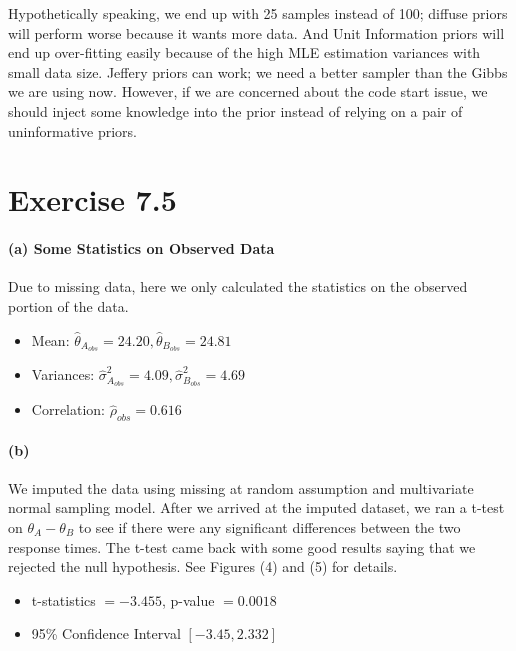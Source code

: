 \documentclass[11pt, letterpaper]{article}
\begin{document}
Hypothetically speaking, we end up with 25 samples instead of 100; diffuse priors will perform worse because it wants more data. And Unit Information priors will end up over-fitting easily because of the high MLE estimation variances with small data size. Jeffery priors can work; we need a better sampler than the Gibbs we are using now. However, if we are concerned about the code start issue, we should inject some knowledge into the prior instead of relying on a pair of uninformative priors.


\newpage
\section{Exercise 7.5}
\paragraph{(a) Some Statistics on Observed Data}
Due to missing data, here we only calculated the statistics on the observed portion of the data.
\begin{itemize}
    \item Mean: $\hat{\theta}_{A_{obs}} = 24.20, \hat{\theta}_{B_{obs}} = 24.81$
    \item Variances: $\hat{\sigma}^2_{A_{obs}} = 4.09, \hat{\sigma}^2_{B_{obs}} = 4.69$
    \item Correlation: $\hat{\rho}_{obs} = 0.616$
\end{itemize}

\paragraph{(b)}
We imputed the data using missing at random assumption and multivariate normal sampling model. After we arrived at the imputed dataset, we ran a t-test on $\theta_A - \theta_B$ to see if there were any significant differences between the two response times. The t-test came back with some good results saying that we rejected the null hypothesis. See Figures (4) and (5) for details.
\begin{itemize}
    \item t-statistics $= -3.455$, p-value $= 0.0018$
    \item 95\% Confidence Interval $[-3.45, 2.332]$
\end{itemize}
\end{document}
